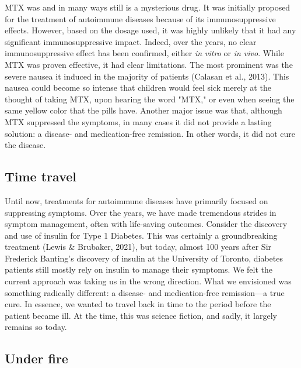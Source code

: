 \documentclass[authordate, editorial, issue]{jote-new-article}
\begin{document}
	MTX was and in many ways still is a mysterious drug. It was initially proposed for the treatment of autoimmune diseases because of its immunosuppressive effects. However, based on the dosage used, it was highly unlikely that it had any significant immunosuppressive impact. Indeed, over the years, no clear immunosuppressive effect has been confirmed, either \emph{in vitro} or \emph{in vivo}. While MTX was proven effective, it had clear limitations. The most prominent was the severe nausea it induced in the majority of patients (Calasan et al., 2013). This nausea could become so intense that children would feel sick merely at the thought of taking MTX, upon hearing the word "MTX," or even when seeing the same yellow color that the pills have. Another major issue was that, although MTX suppressed the symptoms, in many cases it did not provide a lasting solution: a disease- and medication-free remission. In other words, it did not cure the disease.







	\subsection{Time travel}



	Until now, treatments for autoimmune diseases have primarily focused on suppressing symptoms. Over the years, we have made tremendous strides in symptom management, often with life-saving outcomes. Consider the discovery and use of insulin for Type 1 Diabetes. This was certainly a groundbreaking treatment (Lewis \& Brubaker, 2021), but today, almost 100 years after Sir Frederick Banting's discovery of insulin at the University of Toronto, diabetes patients still mostly rely on insulin to manage their symptoms. We felt the current approach was taking us in the wrong direction. What we envisioned was something radically different: a disease- and medication-free remission—a true cure. In essence, we wanted to travel back in time to the period before the patient became ill. At the time, this was science fiction, and sadly, it largely remains so today.







	\subsection{Under fire}
\end{document}
